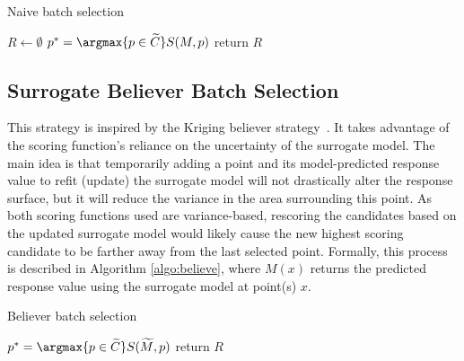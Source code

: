 {\fontsize{10}{10}\selectfont
\begin{algorithm}
\scriptsize
\caption{Naive batch selection}
\label{algo:naive}
\begin{algorithmic}
  \State $R \gets \emptyset$
  \State $p^* = \argmax{p \in \widetilde{C}} S(M, p)$
  \EndWhile
  \State return $R$
\EndProcedure
\end{algorithmic}
\end{algorithm}
}

\subsection{Surrogate Believer Batch Selection}
This strategy is inspired by the Kriging believer strategy~\cite{GotovosCasatiHitz2013,GinsbourgerLeRicheCarraro2009}.
%
It takes advantage of the scoring function's reliance on the uncertainty of the surrogate model.
%
The main idea is that temporarily adding a point and its model-predicted response value to refit (update) the surrogate model will not drastically alter the response surface, but it will reduce the variance in the area surrounding this point.
%
As both scoring functions used are variance-based, rescoring the candidates based on the updated surrogate model would likely cause the new highest scoring candidate to be farther away from the last selected point.
%
Formally, this process is described in Algorithm \ref{algo:believe}, where $M(x)$ returns the predicted response value using the surrogate model at point(s) $x$.

{\fontsize{10}{10}\selectfont
\begin{algorithm}
\scriptsize
\caption{Believer batch selection}
\label{algo:believe}
\begin{algorithmic}
  \State $p^* = \argmax{p \in \widetilde{C}} S(\widetilde{M}, p)$
\EndWhile
\State return $R$
\EndProcedure
\end{algorithmic}
\end{algorithm}
}

